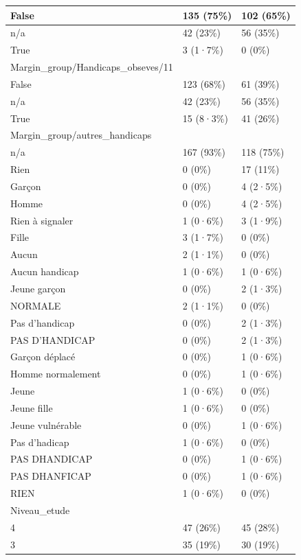 \documentclass[
]{book}
\begin{document}
\begin{tabular}{l|l|l}
\hline
False & 135 (75\%) & 102 (65\%)\\
\hline
n/a & 42 (23\%) & 56 (35\%)\\
\hline
True & 3 (1·7\%) & 0 (0\%)\\
\hline
Margin\_group/Handicaps\_obseves/11 &  & \\
\hline
False & 123 (68\%) & 61 (39\%)\\
\hline
n/a & 42 (23\%) & 56 (35\%)\\
\hline
True & 15 (8·3\%) & 41 (26\%)\\
\hline
Margin\_group/autres\_handicaps &  & \\
\hline
n/a & 167 (93\%) & 118 (75\%)\\
\hline
Rien & 0 (0\%) & 17 (11\%)\\
\hline
Garçon & 0 (0\%) & 4 (2·5\%)\\
\hline
Homme & 0 (0\%) & 4 (2·5\%)\\
\hline
Rien à signaler & 1 (0·6\%) & 3 (1·9\%)\\
\hline
Fille & 3 (1·7\%) & 0 (0\%)\\
\hline
Aucun & 2 (1·1\%) & 0 (0\%)\\
\hline
Aucun handicap & 1 (0·6\%) & 1 (0·6\%)\\
\hline
Jeune garçon & 0 (0\%) & 2 (1·3\%)\\
\hline
NORMALE & 2 (1·1\%) & 0 (0\%)\\
\hline
Pas d'handicap & 0 (0\%) & 2 (1·3\%)\\
\hline
PAS D'HANDICAP & 0 (0\%) & 2 (1·3\%)\\
\hline
Garçon déplacé & 0 (0\%) & 1 (0·6\%)\\
\hline
Homme normalement & 0 (0\%) & 1 (0·6\%)\\
\hline
Jeune & 1 (0·6\%) & 0 (0\%)\\
\hline
Jeune fille & 1 (0·6\%) & 0 (0\%)\\
\hline
Jeune vulnérable & 0 (0\%) & 1 (0·6\%)\\
\hline
Pas d'hadicap & 1 (0·6\%) & 0 (0\%)\\
\hline
PAS DHANDICAP & 0 (0\%) & 1 (0·6\%)\\
\hline
PAS DHANFICAP & 0 (0\%) & 1 (0·6\%)\\
\hline
RIEN & 1 (0·6\%) & 0 (0\%)\\
\hline
Niveau\_etude &  & \\
\hline
4 & 47 (26\%) & 45 (28\%)\\
\hline
3 & 35 (19\%) & 30 (19\%)\\
\hline

\end{tabular}
\end{document}
